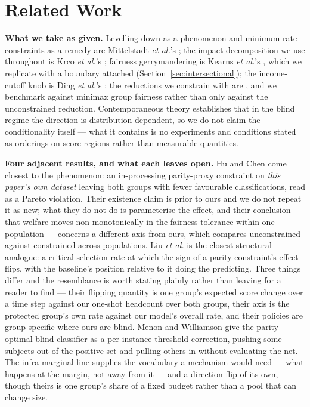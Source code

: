 \documentclass[conference]{IEEEtran}
\begin{document}
\section{Related Work}
\label{sec:related}

\textbf{What we take as given.} Levelling down as a phenomenon and minimum-rate constraints as
a remedy are Mittelstadt \emph{et al.}'s \cite{mittelstadt2023}; the impact decomposition we
use throughout is Krco \emph{et al.}'s \cite{ferry2023}; fairness gerrymandering is Kearns \emph{et al.}'s \cite{kearns2018}, which we replicate
with a boundary attached (Section~\ref{sec:intersectional}); the income-cutoff knob is Ding \emph{et al.}'s
\cite{ding2021}; the reductions we constrain with are \cite{agarwal2018}, and we benchmark against minimax
group fairness \cite{diana2021} rather than only against the unconstrained reduction. Contemporaneous
theory \cite{backfire2026} establishes that in the blind regime the direction is
distribution-dependent, so we do not claim the conditionality itself --- what it contains is
no experiments and conditions stated as orderings on score regions rather than measurable
quantities.

\textbf{Four adjacent results, and what each leaves open.} Hu and Chen \cite{hu2020} come
closest to the phenomenon: an in-processing parity-proxy constraint on \emph{this paper's own
dataset} leaving both groups with fewer favourable classifications, read as a Pareto
violation. Their existence claim is prior to ours and we do not repeat it as new; what they do
not do is parameterise the effect, and their conclusion --- that welfare moves
non-monotonically in the fairness tolerance within one population --- concerns a different
axis from ours, which compares unconstrained against constrained across populations. Liu
\emph{et al.} \cite{liu2018} is the closest structural analogue: a critical selection rate at
which the sign of a parity constraint's effect flips, with the baseline's position relative to
it doing the predicting. Three things differ and the resemblance is worth stating plainly
rather than leaving for a reader to find --- their flipping quantity is one group's expected
score change over a time step against our one-shot headcount over both groups, their axis is
the protected group's own rate against our model's overall rate, and their policies are
group-specific where ours are blind. Menon and Williamson \cite{menon2018} give the
parity-optimal blind classifier as a per-instance threshold correction, pushing some subjects
out of the positive set and pulling others in without evaluating the net. The infra-marginal
line \cite{corbett2017,corbett2023} supplies the vocabulary a mechanism would need --- what
happens at the margin, not away from it --- and a direction flip of its own, though theirs is
one group's share of a fixed budget rather than a pool that can change size.
\end{document}
